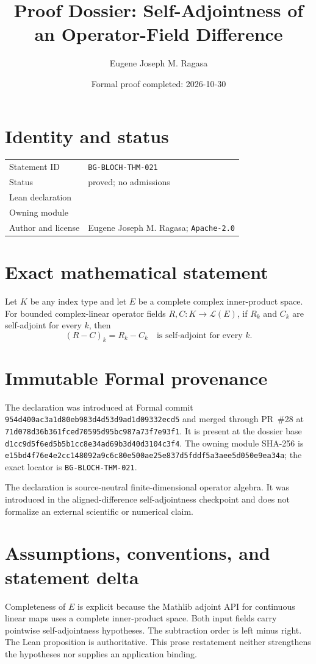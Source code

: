 \documentclass[11pt]{article}
\title{Proof Dossier: Self-Adjointness of an Operator-Field Difference}
\author{Eugene Joseph M. Ragasa}
\date{Formal proof completed: 2026-10-30}
\begin{document}
\raggedright
\maketitle

\section{Identity and status}
\begin{tabularx}{\textwidth}{@{}lY@{}}
\toprule
Statement ID & \texttt{BG-BLOCH-THM-021} \\
Status & proved; no admissions \\
Lean declaration &  \\
Owning module &  \\
Author and license & Eugene Joseph M. Ragasa; \texttt{Apache-2.0} \\
\bottomrule
\end{tabularx}

\section{Exact mathematical statement}
Let $K$ be any index type and let $E$ be a complete complex inner-product space.  For bounded complex-linear operator fields $R,C:K\to\mathcal L(E)$, if $R_k$ and $C_k$ are self-adjoint for every $k$, then
\[
  (R-C)_k=R_k-C_k\quad\text{is self-adjoint for every }k.
\]

\section{Immutable Formal provenance}
The declaration was introduced at Formal commit
\texttt{954d400ac3a1d80eb983d4d53d9ad1d09332ecd5} and merged through PR~\#28 at
\texttt{71d078d36b361fced70595d95bc987a73f7e93f1}.  It is present at the dossier base
\texttt{d1cc9d5f6ed5b5b1cc8e34ad69b3d40d3104c3f4}.  The owning module SHA-256 is
\texttt{e15bd4f76e4e2cc148092a9c6c80e500ae25e837d5fddf5a3aee5d050e9ea34a}; the exact locator is \texttt{BG-BLOCH-THM-021}.

The declaration is source-neutral finite-dimensional operator algebra.  It was introduced in the aligned-difference self-adjointness checkpoint and does not formalize an external scientific or numerical claim.

\section{Assumptions, conventions, and statement delta}
Completeness of $E$ is explicit because the Mathlib adjoint API for continuous linear maps uses a complete inner-product space.  Both input fields carry pointwise self-adjointness hypotheses.  The subtraction order is left minus right.
The Lean proposition is authoritative.  This prose restatement neither strengthens the hypotheses
nor supplies an application binding.
\end{document}
